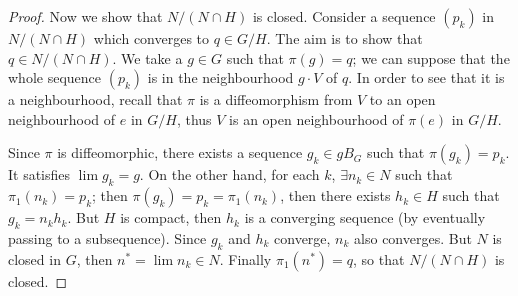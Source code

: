 \begin{proof}
Now we show that $N/(N\cap H)$ is closed. Consider a sequence $(p_k)$ in $N/(N\cap H)$ which converges to $q\in G/H$. The aim is to show that $q\in N/(N\cap H)$. We take a $g\in G$ such that $\pi(g)=q$; we can suppose that the whole sequence $(p_k)$ is in the neighbourhood $g\cdot V$ of $q$. In order to see that it is a neighbourhood, recall that $\pi$ is a diffeomorphism from $V$ to an open neighbourhood of $e$ in $G/H$, thus $V$ is an open neighbourhood of $\pi(e)$ in $G/H$.

Since $\pi$ is diffeomorphic, there exists a sequence $g_k\in gB_G$ such that $\pi(g_k)=p_k$. It satisfies $\lim g_k=g$. On the other hand, for each $k$, $\exists n_k\in N$ such that $\pi_1(n_k)=p_k$; then $\pi(g_k)=p_k=\pi_1(n_k)$, then there exists $h_k\in H$ such that $g_k=n_kh_k$. But $H$ is compact, then $h_k$ is a converging sequence (by eventually passing to a subsequence). Since $g_k$ and $h_k$ converge, $n_k$ also converges. But $N$ is closed in $G$, then $n^*=\lim n_k\in N$. Finally $\pi_1(n^*)=q$, so that $N/(N\cap H)$ is closed.
\end{proof}
